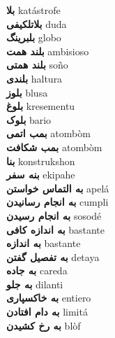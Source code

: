 \textbf{ بلا  } katástrofe \\
\textbf{ بلاتلکیفی  } duda \\
\textbf{ بلبرینگ  } globo \\
\textbf{ بلند همت  } ambisioso \\
\textbf{ بلند همتی  } soño \\
\textbf{ بلندی  } haltura \\
\textbf{ بلوز  } blusa \\
\textbf{ بلوغ  } kresementu \\
\textbf{ بلوک  } bario \\
\textbf{ بمب اتمی  } atombòm \\
\textbf{ بمب شکافت  } atombòm \\
\textbf{ بنا  } konstrukshon \\
\textbf{ بنه سفر  } ekipahe \\
\textbf{ به التماس خواستن  } apelá \\
\textbf{ به انجام رسانیدن  } cumpli \\
\textbf{ به انجام رسیدن  } sosodé \\
\textbf{ به اندازه کافی  } bastante \\
\textbf{ به اندازه  } bastante \\
\textbf{ به تفصیل گفتن  } detaya \\
\textbf{ به جاده  } careda \\
\textbf{ به جلو  } dilanti \\
\textbf{ به خاکسپاری  } entiero \\
\textbf{ به دام افتادن  } limitá \\
\textbf{ به رخ کشیدن  } blòf \\
